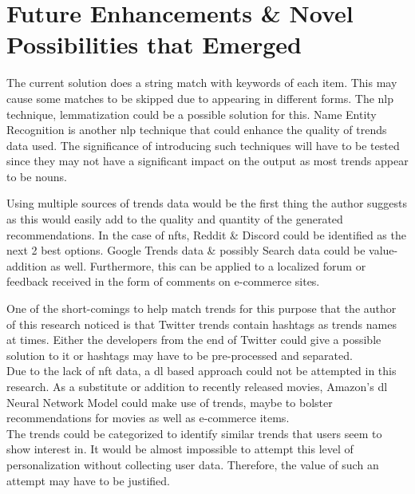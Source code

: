 \documentclass[manuscript,natbib=false, anonymous]{acmart}
\begin{document}
\section{Future Enhancements \& Novel Possibilities that Emerged}

The current solution does a string match with keywords of each item. This may cause some matches to be skipped due to appearing in different forms. The \gls{nlp} technique, lemmatization could be a possible solution for this. Name Entity Recognition is another \gls{nlp} technique that could enhance the quality of trends data used. The significance of introducing such techniques will have to be tested since they may not have a significant impact on the output as most trends appear to be nouns.

Using multiple sources of trends data would be the first thing the author suggests as this would easily add to the quality and quantity of the generated recommendations. In the case of \gls{nft}s, Reddit \& Discord could be identified as the next 2 best options. Google Trends data \& possibly Search data could be value-addition as well. Furthermore, this can be applied to a localized forum or feedback received in the form of comments on e-commerce sites.

One of the short-comings to help match trends for this purpose that the author of this research noticed is that Twitter trends contain hashtags as trends names at times. Either the developers from the end of Twitter could give a possible solution to it or hashtags may have to be pre-processed and separated.\\


Due to the lack of \gls{nft} data, a \gls{dl} based approach could not be attempted in this research. As a substitute or addition to recently released movies, Amazon's \gls{dl} Neural Network Model could make use of trends, maybe to bolster recommendations for movies as well as e-commerce items.\\


The trends could be categorized to identify similar trends that users seem to show interest in. It would be almost impossible to attempt this level of personalization without collecting user data. Therefore, the value of such an attempt may have to be justified.\\
\end{document}

